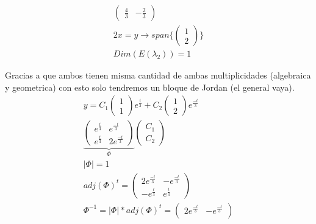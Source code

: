 \begin{mdframed}
\begin{enumerate}
{\begin{itemize}
{\begin{gather*}
\begin{pmatrix}
                    \frac{4}{3} & -\frac{2}{3} 
                    \end{pmatrix}
                    \\
                    2x=y \rightarrow span\{\begin{pmatrix}
                1 \\
                2 
                \end{pmatrix}\}\\
                Dim(E(\lambda_2)) = 1
                \end{gather*}
                }
            \end{itemize}
    }
    Gracias a que ambos tienen misma cantidad de ambas multiplicidades (algebraica y geometrica) con esto solo tendremos un bloque de Jordan (el general vaya).
    \begin{gather*}
        y = C_1 \begin{pmatrix}
                1 \\
                1 
                \end{pmatrix}
            e^{\frac{t}{3}}
            + C_2 \begin{pmatrix}
                1 \\
                2 
                \end{pmatrix}
            e^{\frac{-t}{3}}\\
                \underbrace{\begin{pmatrix}
                 e^{\frac{t}{3}}&  e^{\frac{-t}{3}}\\
                 e^{\frac{t}{3}} & 2 e^{\frac{-t}{3}} 
                \end{pmatrix}}_{\Phi}
                \begin{pmatrix}
                C_1 \\
                C_2 
                \end{pmatrix}\\
        |\Phi| = 1\\
        adj(\Phi)^t=
                \begin{pmatrix}
                 2e^{\frac{-t}{3}}&  -e^{\frac{-t}{3}}\\
                 -e^{\frac{t}{3}} & e^{\frac{t}{3}} 
                \end{pmatrix}\\
        \Phi^{-1}=|\Phi|* adj(\Phi)^t=  \begin{pmatrix}
                                         2e^{\frac{-t}{3}}&  -e^{\frac{-t}{3}}\\

\end{pmatrix}
\end{gather*}
\end{enumerate}
\end{mdframed}
